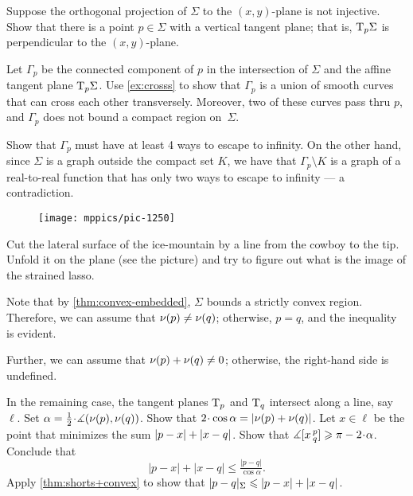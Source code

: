 \begin{multicols}{2}
Suppose the orthogonal projection of $\Sigma$ to the $(x,y)$-plane is not injective.
Show that there is a point $p\in\Sigma$ with a vertical tangent plane;
that is, $\mathrm{T}_p\Sigma$ is perpendicular to the $(x,y)$-plane.

Let $\Gamma_p$ be the connected component of $p$ in the intersection of $\Sigma$ and the affine tangent plane $\mathrm{T}_p\Sigma$.
Use \ref{ex:crosss} to show that $\Gamma_p$ is a union of smooth curves that can cross each other transversely.
Moreover, two of these curves pass thru $p$, and $\Gamma_p$ does not bound a compact region on~$\Sigma$.

Show that $\Gamma_p$ must have at least 4 ways to escape to infinity.
On the other hand, since $\Sigma$ is a graph outside the compact set $K$, we have that $\Gamma_p\setminus K$ is a graph of a real-to-real function that has only two ways to escape to infinity --- a contradiction.


\setcounter{eqtn}{0}

\begin{wrapfigure}{r}{24 mm}
\vskip-6mm
\centering
\texttt{[image: mppics/pic-1250]}
\vskip-0mm
\end{wrapfigure}

Cut the lateral surface of the ice-mountain by a line from the cowboy to the tip.
Unfold it on the plane (see the picture) and try to figure out what is the image of the strained lasso.

Note that by \ref{thm:convex-embedded}, $\Sigma$ bounds a strictly convex region.
Therefore, we can assume that $\nu(p)\ne\nu(q)$; otherwise, $p=q$, and the inequality is evident.

Further, we can assume that $\nu(p)+\nu(q)\ne 0$; otherwise, the right-hand side is undefined.

In the remaining case, the tangent planes $\mathrm{T}_p$ and $\mathrm{T}_q$ intersect along a line, say $\ell$.
Set $\alpha=\tfrac12\cdot\measuredangle(\Norm(p),\Norm(q))$.
Show that $2\cdot\cos\alpha\z= |\Norm(p)+\Norm(q)|$.
Let $x\in \ell$ be the point that minimizes the sum $|p-x|\z+|x-q|$.
Show that $\measuredangle\hinge xpq\ge \pi-2\cdot\alpha$.
Conclude that 
\[|p-x|+|x-q|\le \tfrac{|p-q|}{\cos\alpha}.\]
Apply \ref{thm:shorts+convex} to show that
$\dist{p}{q}\Sigma\le |p-x|+|x-q|$.



\end{multicols}

